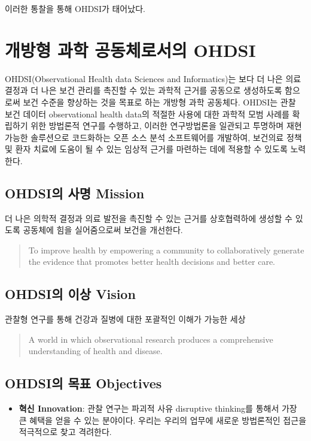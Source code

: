 \documentclass[10.5pt]{book}
\providecommand{\tightlist}{%
  \setlength{\itemsep}{0pt}\setlength{\parskip}{0pt}}
\theoremstyle{definition}
\theoremstyle{definition}
\theoremstyle{definition}
\theoremstyle{remark}
\begin{document}
이러한 통찰을 통해 OHDSI가 태어났다.

\section{개방형 과학 공동체로서의 OHDSI}\label{---ohdsi}

OHDSI(Observational Health data Sciences and Informatics)는 보다 더 나은
의료 결정과 더 나은 보건 관리를 촉진할 수 있는 과학적 근거를 공동으로
생성하도록 함으로써 보건 수준을 향상하는 것을 목표로 하는 개방형 과학
공동체다. \citep{Hripcsak2015} OHDSI는 관찰 보건 데이터 observational
health data의 적절한 사용에 대한 과학적 모범 사례를 확립하기 위한
방법론적 연구를 수행하고, 이러한 연구방법론을 일관되고 투명하며 재현
가능한 솔루션으로 코드화하는 오픈 소스 분석 소프트웨어를 개발하여,
보건의료 정책 및 환자 치료에 도움이 될 수 있는 임상적 근거를 마련하는
데에 적용할 수 있도록 노력한다.

\subsection{OHDSI의 사명 Mission}\label{ohdsi--mission}

더 나은 의학적 결정과 의료 발전을 촉진할 수 있는 근거를 상호협력하에
생성할 수 있도록 공동체에 힘을 실어줌으로써 보건을 개선한다.

\begin{quote}
To improve health by empowering a community to collaboratively generate
the evidence that promotes better health decisions and better care.
\end{quote}

\subsection{OHDSI의 이상 Vision}\label{ohdsi--vision}

관찰형 연구를 통해 건강과 질병에 대한 포괄적인 이해가 가능한 세상

\begin{quote}
A world in which observational research produces a comprehensive
understanding of health and disease. 
\end{quote}

\subsection{OHDSI의 목표 Objectives}\label{ohdsi--objectives}

\begin{itemize}
\tightlist
\item
  \textbf{혁신 Innovation}: 관찰 연구는 파괴적 사유 disruptive
  thinking를 통해서 가장 큰 혜택을 얻을 수 있는 분야이다. 우리는 우리의
  업무에 새로운 방법론적인 접근을 적극적으로 찾고 격려한다.
\end{itemize}
\end{document}

